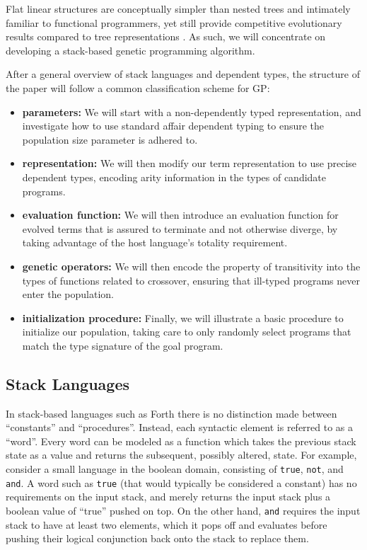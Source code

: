 \documentclass[runningheads,a4paper]{llncs}
\begin{document}
Flat linear structures are conceptually simpler than nested trees and
intimately familiar to functional programmers, yet still provide
competitive evolutionary results compared to tree representations
\cite{tchernev:crossmethods}. As such, we will concentrate on
developing a stack-based genetic programming algorithm.

After a general overview of stack languages and dependent types, the
structure of the paper will follow a common classification scheme for
GP:
\begin{itemize}
\item{\textbf{parameters:}} We will start with a non-dependently typed
  representation, and investigate how to use standard affair dependent
  typing to ensure the population size parameter is adhered to.
\item{\textbf{representation:}} We will then modify our
  term representation to use precise dependent types, encoding arity
  information in the types of candidate programs.
\item{\textbf{evaluation function:}} We will then introduce
  an evaluation function for evolved terms that is assured to
  terminate and not otherwise diverge, by taking advantage of the host
  language's totality requirement.
\item{\textbf{genetic operators:}} We will then encode
  the property of transitivity into the types of functions related to
  crossover, ensuring that ill-typed programs never enter the
  population.
\item{\textbf{initialization procedure:}} Finally, we will illustrate a basic
  procedure to initialize our population, taking care to only randomly
  select programs that match the type signature of the goal program.
\end{itemize}

\subsection{Stack Languages}

In stack-based languages such as Forth \cite{kelly:forth} there is no
distinction made between ``constants'' and ``procedures''. Instead, each syntactic
element is referred to as a ``word''. Every word can be modeled as a
function which takes the previous stack state as a value and returns
the subsequent, possibly altered, state. For example, consider a
small language in the boolean domain, consisting of \texttt{true},
\texttt{not}, and \texttt{and}. A word
such as \texttt{true} (that would typically be considered a constant)
has no requirements on the input stack, and merely returns the input
stack plus a boolean value of ``true'' pushed on top. On the other
hand, \texttt{and} requires the input stack to have at least two elements,
which it pops off and evaluates before pushing their logical conjunction back
onto the stack to replace them.
\end{document}
